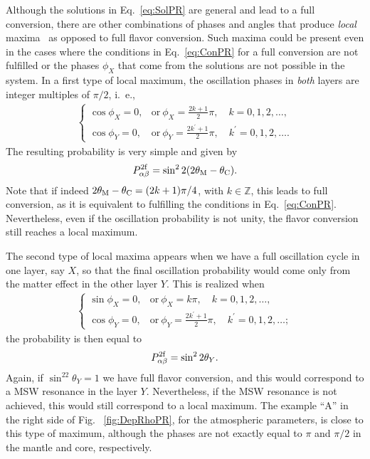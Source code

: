 Although the solutions in Eq.~\eqref{eq:SolPR} are general and lead to a full conversion, there are other combinations of phases and angles that produce \emph{local} maxima~\cite{Akhmedov:1998ui,Akhmedov:1998xq,Chizhov:1998ug,Chizhov:1999az,Chizhov:1999he} as opposed to full flavor conversion. 
Such maxima could be present even in the cases where the conditions in Eq.~\eqref{eq:ConPR} for a full conversion are not fulfilled or the phases $\phi_X$ that come from the solutions are not possible in the system.
In a first type of local maximum, the oscillation phases in \emph{both} layers are integer multiples of $\pi/2$, i.~e.,
\begin{align}\label{eq:FType}
\begin{cases}
	\cos\phi_X= 0, & \text{or}\ \phi_X = \frac{2k + 1}{2}\pi,\quad k = 0,1,2,\ldots, \\
	\cos\phi_Y=0, & \text{or}\ \phi_Y= \frac{2k^\prime + 1}{2}\pi,\quad k^\prime  = 0,1,2,\ldots.
\end{cases}
\end{align}
The resulting probability is very simple and given by
\begin{align}
	P_{\alpha\beta}^{\rm 2f} = \sin^2 2(2\theta_{\rm M}-\theta_{\rm C}).
\end{align}
Note that if indeed $2\theta_{\rm M}-\theta_{\rm C}=(2k+1)\pi/4$, with $k\in \mathbb{Z}$, this leads to full conversion, as it is equivalent to fulfilling the conditions in Eq.~\eqref{eq:ConPR}. 
Nevertheless, even if the oscillation probability is not unity, the flavor conversion still reaches a local maximum.

The second type of local maxima appears when we have a full oscillation cycle in one layer, say $X$, so that the final oscillation probability would come only from the matter effect in the other layer $Y$. This is realized when
\begin{align}
\begin{cases}
	\sin\phi_X= 0, & \text{or}\ \phi_X = k\pi,\quad k = 0,1,2,\ldots, \\
	\cos\phi_Y=0, & \text{or}\ \phi_Y= \frac{2k^\prime + 1}{2}\pi,\quad k^\prime  = 0,1,2,\ldots;
\end{cases}
\end{align}
the probability is then equal to
\begin{align}
	P_{\alpha\beta}^{\rm 2f} = \sin^2 2\theta_Y.
\end{align}
Again, if $\sin^22\theta_Y=1$ we have full flavor conversion, and this would correspond to a MSW resonance in the layer $Y$.
Nevertheless, if the MSW resonance is not achieved, this would still correspond to a local maximum.
The example ``A'' in the right side of Fig.~ \ref{fig:DepRhoPR}, for the atmospheric parameters, is close to this type of maximum, although the phases are not exactly equal to $\pi$ and $\pi/2$ in the mantle and core, respectively.

